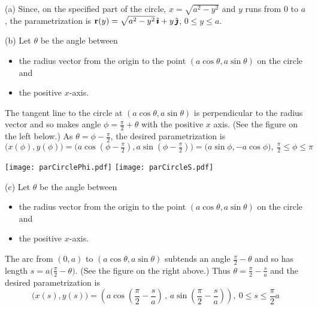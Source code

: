 \begin{solution} 
(a) 
Since, on the specified part of the  circle, 
$x=\sqrt{a^2-y^2}$ and  $y$ runs from $0$ to $a$, 
the parametrization is
$\mathbf{r}(y)=\sqrt{a^2-y^2}\,\hat{\pmb{\imath}}+ y\,\hat{\pmb{\jmath}}$, $0\le y\le a$.

(b) Let $\theta$ be the angle between 
\begin{itemize}\itemsep1pt \parskip0pt 
\item the radius vector from the origin to the point 
$(a\cos\theta,a\sin\theta)$  on the circle and 
\item
the positive $x$-axis. 
\end{itemize}
The tangent line to the circle at $(a\cos\theta,a\sin\theta)$ 
is perpendicular to the radius vector and so makes angle $\phi=\frac{\pi}{2}+\theta$ with the positive $x$ axis.
(See the figure on the left below.)
As $\theta =\phi-\frac{\pi}{2}$, the desired parametrization is
\begin{equation*}
\big(x(\phi),y(\phi)\big)
=\big(a\cos(\phi-\tfrac{\pi}{2}),a\sin(\phi-\tfrac{\pi}{2})\big)
=\big(a\sin \phi ,-a\cos \phi \big),\ 
  \tfrac{\pi}{2}\le\phi\le\pi
\end{equation*}

\begin{center}
       \texttt{[image: parCirclePhi.pdf]}\quad
       \texttt{[image: parCircleS.pdf]}
\end{center}


(c) Let $\theta$ be the angle between 
\begin{itemize}\itemsep1pt \parskip0pt 
\item the radius vector from the origin to the point 
$(a\cos\theta,a\sin\theta)$  on the circle and 
\item
the positive $x$-axis. 
\end{itemize} 
The arc from $(0,a)$ to $(a\cos\theta,a\sin\theta)$ 
subtends an angle $\frac{\pi}{2}-\theta$ and so
has length $s=a\big(\frac{\pi}{2}-\theta\big)$. (See the figure
on the right above.) Thus $\theta=\frac{\pi}{2}-\frac{s}{a}$
and the desired parametrization is
\begin{equation*}
\big(x(s),y(s)\big)
=\left(a\cos\left(\frac{\pi}{2}-\frac{s}{a}\right)\,,\,
           a\sin\left(\frac{\pi}{2}-\frac{s}{a}\right)\right)
,\ 0\le s\le\frac{\pi}{2}a
\end{equation*}
\end{solution}





